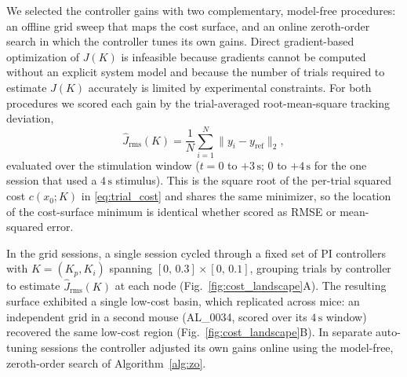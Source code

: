 We selected the controller gains with two complementary, model-free
procedures: an offline grid sweep that maps the cost surface, and an
online zeroth-order search in which the controller tunes its own gains.
Direct gradient-based optimization of $J(K)$ is infeasible because
gradients cannot be computed without an explicit system model and because
the number of trials required to estimate $J(K)$ accurately is limited by
experimental constraints. For both procedures we scored each gain by the
trial-averaged root-mean-square tracking deviation,
%
\begin{equation}
    \hat{J}_{\mathrm{rms}}(K) = \frac{1}{N}\sum_{i=1}^{N}
        \big\| y_i - y_{\mathrm{ref}} \big\|_2 ,
    \label{eq:rms_cost}
\end{equation}
%
evaluated over the stimulation window ($t = 0$ to $+3\,\text{s}$; $0$ to
$+4\,\text{s}$ for the one session that used a $4\,\text{s}$ stimulus).
This is the square root of the per-trial squared cost $c(x_0;K)$ in
\eqref{eq:trial_cost} and shares the same minimizer, so the location of
the cost-surface minimum is identical whether scored as RMSE or
mean-squared error.

In the grid sessions, a single session cycled through a fixed set of PI
controllers with $K=(K_p,K_i)$ spanning $[0,\,0.3]\times[0,\,0.1]$,
grouping trials by controller to estimate $\hat{J}_{\mathrm{rms}}(K)$ at
each node (Fig.~\ref{fig:cost_landscape}A). The resulting surface
exhibited a single low-cost basin, which replicated across mice: an
independent grid in a second mouse (AL\_0034, scored over its
$4\,\text{s}$ window) recovered the same low-cost region
(Fig.~\ref{fig:cost_landscape}B). In separate auto-tuning sessions the
controller adjusted its own gains online using the model-free,
zeroth-order search of Algorithm~\ref{alg:zo}.

